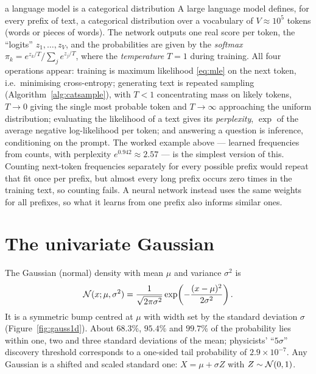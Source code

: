 \documentclass[11pt]{article}
\begin{document}
\begin{modern}{a language model is a categorical distribution}
A large language model defines, for every prefix of text, a categorical distribution over a vocabulary of
$V \approx 10^5$ tokens (words or pieces of words). The network outputs one real score per token, the
``logits'' $z_1, \dots, z_V$, and the probabilities are given by the \emph{softmax}
$\pi_k = e^{z_k/T} / \sum_j e^{z_j/T}$, where the \emph{temperature} $T = 1$ during training. All four operations
appear: training is maximum likelihood \eqref{eq:mle} on the next token, i.e.\ minimising cross-entropy; generating
text is repeated sampling (Algorithm~\ref{alg:catsample}), with $T < 1$ concentrating mass on likely tokens,
$T \to 0$ giving the single most probable token and $T \to \infty$ approaching the uniform distribution; evaluating
the likelihood of a text gives its \emph{perplexity}, $\exp$ of the average negative log-likelihood per token; and
answering a question is inference, conditioning on the prompt. The worked example above --- learned frequencies from
counts, with perplexity $e^{0.942} \approx 2.57$ --- is the simplest version of this. Counting next-token frequencies
separately for every possible prefix would repeat that fit once per prefix, but almost every long prefix occurs zero
times in the training text, so counting fails. A neural network instead uses the same weights for all prefixes, so
what it learns from one prefix also informs similar ones.
\end{modern}

\section{The univariate Gaussian}\label{sec:gauss1d}

The Gaussian (normal) density with mean $\mu$ and variance $\sigma^2$ is
\begin{equation}\label{eq:gauss1d}
  \mathcal{N}(x; \mu, \sigma^2) = \frac{1}{\sqrt{2\pi\sigma^2}} \exp\!\left( -\frac{(x - \mu)^2}{2\sigma^2} \right).
\end{equation}
It is a symmetric bump centred at $\mu$ with width set by the standard deviation $\sigma$
(Figure~\ref{fig:gauss1d}). About $68.3\%$, $95.4\%$ and $99.7\%$ of the probability lies within one, two and three
standard deviations of the mean; physicists' ``$5\sigma$'' discovery threshold corresponds to a one-sided tail
probability of $2.9 \times 10^{-7}$. Any Gaussian is a shifted and scaled standard one:
$X = \mu + \sigma Z$ with $Z \sim \mathcal{N}(0, 1)$.
\end{document}
